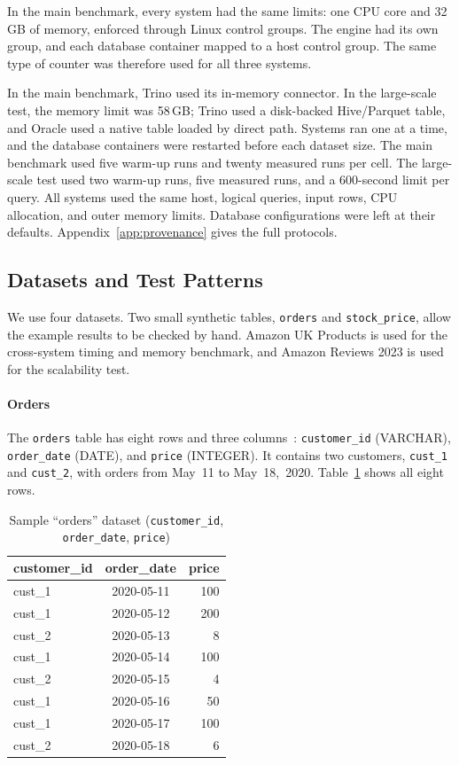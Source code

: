 \documentclass[preprint,12pt,times,a4paper]{elsarticle}
\begin{document}
In the main benchmark, every system had the same limits: one CPU core and 32\,GB of
memory, enforced through Linux control groups. The engine had its own group,
and each database container mapped to a host control group. The same type of
counter was therefore used for all three systems.

In the main benchmark, Trino used its in-memory connector. In the large-scale
test, the memory limit was 58\,GB; Trino used a disk-backed Hive/Parquet table,
and Oracle used a native table loaded by direct path. Systems ran one at a
time, and the database containers were restarted before each dataset size.
The main benchmark used five warm-up runs and twenty measured runs per cell.
The large-scale test used two warm-up runs, five measured runs, and a
600-second limit per query. All systems used the same host, logical queries,
input rows, CPU allocation, and outer memory limits. Database configurations
were left at their defaults. Appendix~\ref{app:provenance} gives the full
protocols.

\subsection{Datasets and Test Patterns}

We use four datasets. Two small synthetic tables, \texttt{orders} and
\texttt{stock\_price}, allow the example results to be checked by hand.
Amazon UK Products is used for the cross-system timing and memory benchmark,
and Amazon Reviews 2023 is used for the scalability test.

\paragraph{Orders}
The \texttt{orders} table has eight rows and three columns~\cite{trino2021row}:
\texttt{customer\_id} (VARCHAR), \texttt{order\_date} (DATE), and
\texttt{price} (INTEGER). It contains two customers, \texttt{cust\_1} and
\texttt{cust\_2}, with orders from May~11 to May~18,~2020.
Table~\ref{tab:orders} shows all eight rows.

\begin{table}[H]
  \centering\small

  \begin{tabular}{lcr}
    \toprule
    \textbf{customer\_id} & \textbf{order\_date} & \textbf{price} \\
    \midrule
    cust\_1 & 2020-05-11 & 100 \\
    cust\_1 & 2020-05-12 & 200 \\
    cust\_2 & 2020-05-13 &   8 \\
    cust\_1 & 2020-05-14 & 100 \\
    cust\_2 & 2020-05-15 &   4 \\
    cust\_1 & 2020-05-16 &  50 \\
    cust\_1 & 2020-05-17 & 100 \\
    cust\_2 & 2020-05-18 &   6 \\
    \bottomrule
  \end{tabular}
\caption{Sample “orders” dataset (\texttt{customer\_id}, \texttt{order\_date}, \texttt{price})}
  \label{tab:orders}
\end{table}
\end{document}

